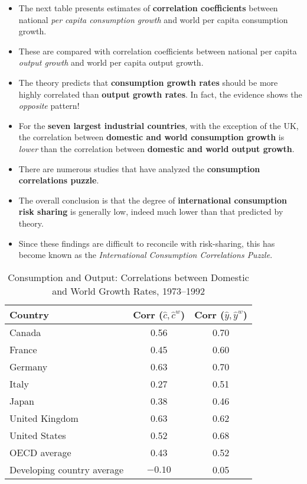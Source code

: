 \documentclass[12pt]{article}
\begin{document}
\begin{itemize}
    \item The next table presents estimates of \textbf{correlation coefficients} between national \textit{per capita consumption growth} and world per capita consumption growth.
    
    \item These are compared with correlation coefficients between national per capita \textit{output growth} and world per capita output growth.
    
    \item The theory predicts that \textbf{consumption growth rates} should be more highly correlated than \textbf{output growth rates}. In fact, the evidence shows the \textit{opposite} pattern!
    
    \item For the \textbf{seven largest industrial countries}, with the exception of the UK, the correlation between \textbf{domestic and world consumption growth} is \textit{lower} than the correlation between \textbf{domestic and world output growth}.
    
    \item There are numerous studies that have analyzed the \textbf{consumption correlations puzzle}.
    
    \item The overall conclusion is that the degree of \textbf{international consumption risk sharing} is generally low, indeed much lower than that predicted by theory.
    
    \item Since these findings are difficult to reconcile with risk-sharing, this has become known as the \textit{International Consumption Correlations Puzzle}.
\end{itemize}

\begin{table}[H]
\centering
\begin{tabular}{lcc}
\toprule
\textbf{Country} & \textbf{Corr ($\hat{c}, \hat{c}^w$)} & \textbf{Corr ($\hat{y}, \hat{y}^w$)} \\
\midrule
Canada & 0.56 & 0.70 \\
France & 0.45 & 0.60 \\
Germany & 0.63 & 0.70 \\
Italy & 0.27 & 0.51 \\
Japan & 0.38 & 0.46 \\
United Kingdom & 0.63 & 0.62 \\
United States & 0.52 & 0.68 \\
\midrule
OECD average & 0.43 & 0.52 \\
Developing country average & $-0.10$ & 0.05 \\
\bottomrule
\end{tabular}
\caption{Consumption and Output: Correlations between Domestic and World Growth Rates, 1973--1992}
\end{table}
\end{document}
